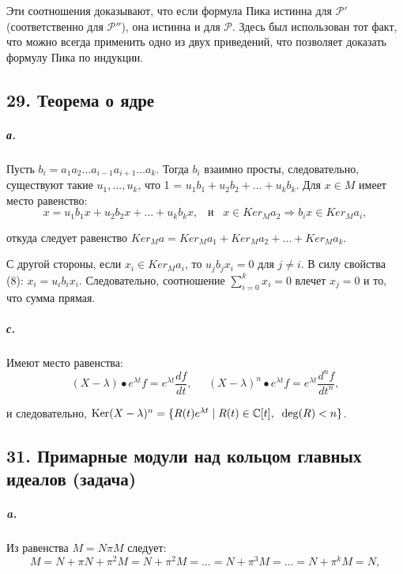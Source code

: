 {\noindent Эти соотношения доказывают, что если формула Пика истинна для $\mathcal{P}'$ (соответственно для $\mathcal{P}''$), она истинна и для $\mathcal{P}$. Здесь был использован тот факт, что можно всегда применить одно из двух приведений, что позволяет доказать формулу Пика по индукции.

\subsection{\normalsize{29. Теорема о ядре}}

\subparagraph{а.} Пусть $b_{i} = a_{1}a_{2}\ldots a_{i-1}a_{i+1}\ldots a_{k}$. Тогда $b_{i}$ взаимно просты, следовательно, существуют такие $u_{1},\ldots,u_{k}$, что 1 = $u_{1}b_{1}+u_{2}b_{2}+\dots+u_{k}b_{k}$. Для $x \in M$ имеет место равенство:
\begin{equation}
x = u_{1}b_{1}x + u_{2}b_{2}x +\dots+ u_{k}b_{k}x,\;\;\;\text{и}\;\;\;x \in Ker_{M} a_{2} \Rightarrow b_{i}x \in Ker_{M} a_{i},
\end{equation}

\noindent откуда следует равенство $Ker_{M} a = Ker_{M} a_{1} + Ker_{M} a_{2} +\dots+ Ker_{M} a_{k}$.

С другой стороны, если $x_{i} \in Ker_{M} a_{i}$, то $u_{j}b_{j}x_{i} = 0$ для $j \neq i$. В силу свойства (8): $x_{i} = u_{i}b_{i}x_{i}$. Следовательно, соотношение $\sum_{i = 0}^{k}x_{i} = 0$ влечет $x_{j} = 0$ и то, что сумма прямая.




\subparagraph{с.} Имеют место равенства:
\begin{equation*}
(X - \lambda) \bullet e^{\lambda t}f = e^{\lambda t}\frac{df}{dt},\;\;\;\;\; (X - \lambda)^{n} \bullet e^{\lambda t}f = e^{\lambda t}\frac{d^{n}f}{dt^{n}},
\end{equation*}

\noindent и следовательно, ${\rm Ker}(X - \lambda)^{n} = \{R(t)e^{\lambda t} \;|\; R(t) \in \mathbb {C}[t],\;\;{\rm deg}(R) < n\}$.

\subsection{\normalsize{31. Примарные модули над кольцом главных идеалов (задача)}}

\subparagraph{a.} Из равенства $M = N \pi M$ следует:
\begin{equation*}
M = N + \pi N + \pi^{2}M = N + \pi^{2}M =\dots= N + \pi^{3}M=\dots= N + \pi^{k}M = N,
\end{equation*}

}

